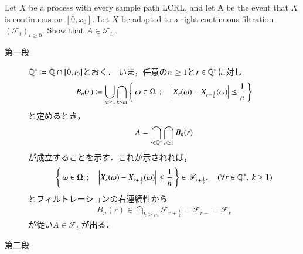 \begin{screen}
	\begin{thm}
		Let $X$ be a process with every sample path LCRL, and 
		let A be the event that $X$ is continuous on $[0,x_0]$.
		Let $X$ be adapted to a right-continuous filtration 
		$(\mathscr{F}_t)_{t \geq 0}$. Show that $A \in \mathscr{F}_{t_0}$.
	\end{thm}
\end{screen}

\begin{prf}\mbox{}
	\begin{description}
		\item[第一段]
			$\mathbb{Q}^* \coloneqq \mathbb{Q} \cap [0,t_0]$とおく．
			いま，任意の$n \geq 1$と$r \in \mathbb{Q}^*$に対し
			\begin{align}
				B_n (r) \coloneqq
				\bigcup_{m \geq 1} \bigcap_{k \leq m} 
				\left\{\ \omega \in \Omega\ \, ; \quad \left| X_r(\omega)-X_{r+\frac{1}{k}}(\omega) \right| \leq \frac{1}{n}\ \right\}
			\end{align}
			と定めるとき，
			\begin{align}
				A = \bigcap_{r \in \mathbb{Q}^*} \bigcap_{n \geq 1} B_n(r)
			\end{align}
			が成立することを示す．これが示されれば，
			\begin{align}
				\left\{\ \omega \in \Omega\ \, ; \quad \left| X_r(\omega)-X_{r+\frac{1}{k}}(\omega) \right| \leq \frac{1}{n}\ \right\}
				\in \mathscr{F}_{r+\frac{1}{k}},
				\quad (\forall r \in \mathbb{Q}^*,\ k \geq 1)
			\end{align}
			とフィルトレーションの右連続性から
			\begin{align}
				B_n (r) \in \bigcap_{k \geq m} \mathscr{F}_{r+\frac{1}{k}} = \mathscr{F}_{r+} = \mathscr{F}_{r}
			\end{align}
			が従い$A \in \mathscr{F}_{t_0}$が出る．
		
		\item[第二段]
			
	\end{description}
\end{prf}